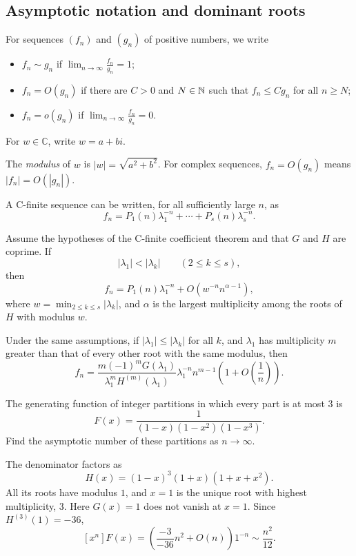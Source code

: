 \subsection{Asymptotic notation and dominant roots}
For sequences $(f_n)$ and $(g_n)$ of positive numbers, we write
\begin{itemize}
\item $f_n\sim g_n$ if $\displaystyle\lim_{n\to\infty}\frac{f_n}{g_n}=1$;
\item $f_n=O(g_n)$ if there are $C>0$ and $N\in\mathbb{N}$ such that $f_n\le Cg_n$ for all $n\ge N$;
\item $f_n=o(g_n)$ if $\displaystyle\lim_{n\to\infty}\frac{f_n}{g_n}=0$.
\end{itemize}
For $w\in\mathbb C$, write $w=a+bi$.

The \textit{modulus} of $w$ is $|w|=\sqrt{a^2+b^2}$. For complex sequences, $f_n=O(g_n)$ means $|f_n|=O(|g_n|)$.

A C-finite sequence can be written, for all sufficiently large $n$, as
\[
f_n=P_1(n)\lambda_1^{-n}+\cdots+P_s(n)\lambda_s^{-n}.
\]
\begin{corollary}
Assume the hypotheses of the C-finite coefficient theorem and that $G$ and $H$ are coprime. If
\[
|\lambda_1|<|\lambda_k|\qquad(2\le k\le s),
\]
then
\[
f_n=P_1(n)\lambda_1^{-n}+O(w^{-n}n^{\alpha-1}),
\]
where $\displaystyle w=\min_{2\le k\le s}|\lambda_k|$, and $\alpha$ is the largest multiplicity among the roots of $H$ with modulus $w$.
\end{corollary}

\begin{corollary}
Under the same assumptions, if $|\lambda_1|\le|\lambda_k|$ for all $k$, and $\lambda_1$ has multiplicity $m$ greater than that of every other root with the same modulus, then
\[
f_n=\frac{m(-1)^mG(\lambda_1)}{\lambda_1^mH^{(m)}(\lambda_1)}
\lambda_1^{-n}n^{m-1}\left(1+O\left(\frac1n\right)\right).
\]
\end{corollary}
\begin{example}
The generating function of integer partitions in which every part is at most $3$ is
\[
F(x)=\frac1{(1-x)(1-x^2)(1-x^3)}.
\]
Find the asymptotic number of these partitions as $n\to\infty$.\par\medskip
The denominator factors as
\[
H(x)=(1-x)^3(1+x)(1+x+x^2).
\]
All its roots have modulus $1$, and $x=1$ is the unique root with highest multiplicity, $3$. Here $G(x)=1$ does not vanish at $x=1$. Since $H^{(3)}(1)=-36$,
\[
[x^n]F(x)=\left(\frac{-3}{-36}n^2+O(n)\right)1^{-n}
\sim\frac{n^2}{12}.
\]
\end{example}
